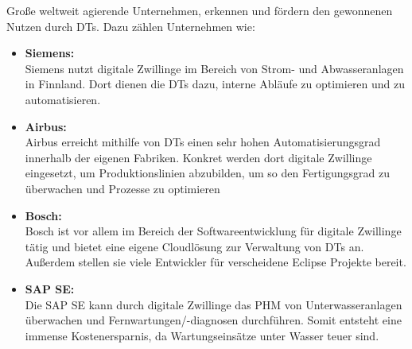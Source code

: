 \pagebreak

Große weltweit agierende Unternehmen, erkennen und fördern den gewonnenen Nutzen durch \ac{DT}s. Dazu zählen Unternehmen wie:
\begin{itemize}
    \item \textbf{Siemens:}\\ Siemens nutzt digitale Zwillinge im Bereich von Strom- und Abwasseranlagen in Finnland. Dort dienen die \ac{DT}s dazu, interne Abläufe zu optimieren und zu automatisieren.\autocite{tao2018digital}
    \item \textbf{Airbus:}\\ Airbus erreicht mithilfe von \ac{DT}s einen sehr hohen Automatisierungsgrad innerhalb der eigenen Fabriken. Konkret werden dort digitale Zwillinge eingesetzt, um Produktionslinien abzubilden, um so den Fertigungsgrad zu überwachen und Prozesse zu optimieren \autocite{tao2018digital}
    \item \textbf{Bosch:}\\ Bosch ist vor allem im Bereich der Softwareentwicklung für digitale Zwillinge tätig und bietet eine eigene Cloudlösung zur Verwaltung von \ac{DT}s an. Außerdem stellen sie viele Entwickler für verscheidene Eclipse Projekte bereit. \autocite{tao2018digital}
    \item \textbf{SAP SE:}\\ Die SAP SE kann durch digitale Zwillinge das \ac{PHM} von Unterwasseranlagen überwachen und Fernwartungen/-diagnosen durchführen. Somit entsteht eine immense Kostenersparnis, da Wartungseinsätze unter Wasser teuer sind. \autocite{tao2018digital}
\end{itemize}


